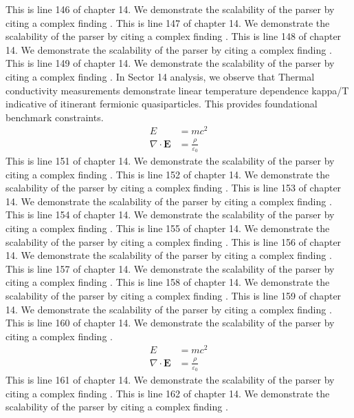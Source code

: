 This is line 146 of chapter 14. We demonstrate the scalability of the parser by citing a complex finding \cite{ref14_146}.
This is line 147 of chapter 14. We demonstrate the scalability of the parser by citing a complex finding \cite{ref14_147}.
This is line 148 of chapter 14. We demonstrate the scalability of the parser by citing a complex finding \cite{ref14_148}.
This is line 149 of chapter 14. We demonstrate the scalability of the parser by citing a complex finding \cite{ref14_149}.
In Sector 14 analysis, we observe that Thermal conductivity measurements demonstrate linear temperature dependence kappa/T indicative of itinerant fermionic quasiparticles. This provides foundational benchmark constraints.
\begin{align*}
  E &= mc^2 \\
  \nabla \cdot \mathbf{E} &= \frac{\rho}{\varepsilon_0}
\end{align*}
This is line 151 of chapter 14. We demonstrate the scalability of the parser by citing a complex finding \cite{ref14_151}.
This is line 152 of chapter 14. We demonstrate the scalability of the parser by citing a complex finding \cite{ref14_152}.
This is line 153 of chapter 14. We demonstrate the scalability of the parser by citing a complex finding \cite{ref14_153}.
This is line 154 of chapter 14. We demonstrate the scalability of the parser by citing a complex finding \cite{ref14_154}.
This is line 155 of chapter 14. We demonstrate the scalability of the parser by citing a complex finding \cite{ref14_155}.
This is line 156 of chapter 14. We demonstrate the scalability of the parser by citing a complex finding \cite{ref14_156}.
This is line 157 of chapter 14. We demonstrate the scalability of the parser by citing a complex finding \cite{ref14_157}.
This is line 158 of chapter 14. We demonstrate the scalability of the parser by citing a complex finding \cite{ref14_158}.
This is line 159 of chapter 14. We demonstrate the scalability of the parser by citing a complex finding \cite{ref14_159}.
This is line 160 of chapter 14. We demonstrate the scalability of the parser by citing a complex finding \cite{ref14_160}.
\begin{align*}
  E &= mc^2 \\
  \nabla \cdot \mathbf{E} &= \frac{\rho}{\varepsilon_0}
\end{align*}
This is line 161 of chapter 14. We demonstrate the scalability of the parser by citing a complex finding \cite{ref14_161}.
This is line 162 of chapter 14. We demonstrate the scalability of the parser by citing a complex finding \cite{ref14_162}.
